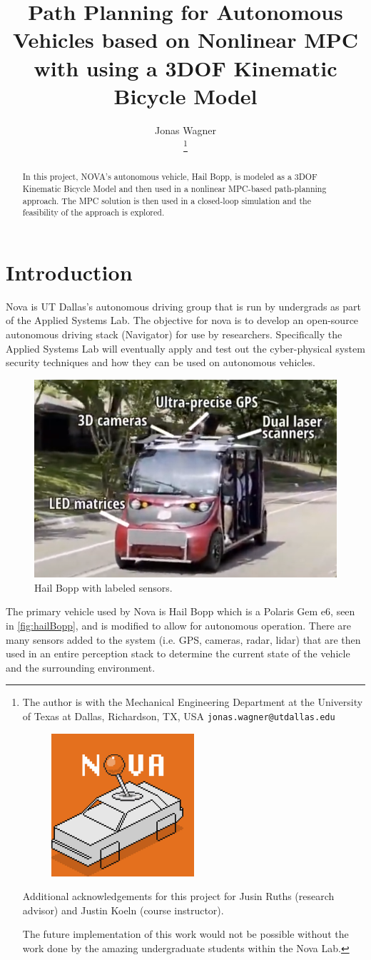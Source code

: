\documentclass[]{IEEEtran}
\title{
    Path Planning for Autonomous Vehicles based on Nonlinear MPC with using a 3DOF Kinematic Bicycle Model
}
\author{
    Jonas Wagner

    \thanks{

        The author is with the Mechanical Engineering Department at the University of Texas at Dallas, Richardson, TX, USA 
        {\tt\small jonas.wagner@utdallas.edu}

        \begin{figure}
            \includegraphics[width=0.15\columnwidth]{figs/NOVA-logo.png}
        \end{figure}
        
        Additional acknowledgements for this project for Jusin Ruths (research advisor) and Justin Koeln (course instructor).

        The future implementation of this work would not be possible without the work done by the amazing undergraduate students within the Nova Lab.
    }
}
\begin{document}
\maketitle
\begin{abstract}
    In this project, NOVA's autonomous vehicle, Hail Bopp, is modeled as a 3DOF Kinematic Bicycle Model and then used in a nonlinear MPC-based path-planning approach.
    The MPC solution is then used in a closed-loop simulation and the feasibility of the approach is explored.
\end{abstract}

\section{Introduction}

Nova is UT Dallas's autonomous driving group that is run by undergrads as part of the Applied Systems Lab.
The objective for nova is to develop an open-source autonomous driving stack (Navigator) for use by researchers.
Specifically the Applied Systems Lab will eventually apply and test out the cyber-physical system security techniques and how they can be used on autonomous vehicles.\cite{nova}

\begin{figure}[h]
    \centering
    \includegraphics[width=0.7\columnwidth]{figs/NOVA-annotatedImage.png}
    \caption{Hail Bopp with labeled sensors.}
\label{fig:hailBopp}
\end{figure}

The primary vehicle used by Nova is Hail Bopp which is a Polaris Gem e6, seen in \autoref{fig:hailBopp}, and is modified to allow for autonomous operation.
There are many sensors added to the system (i.e. GPS, cameras, radar, lidar) that are then used in an entire perception stack to determine the current state of the vehicle and the surrounding environment.
\end{document}
